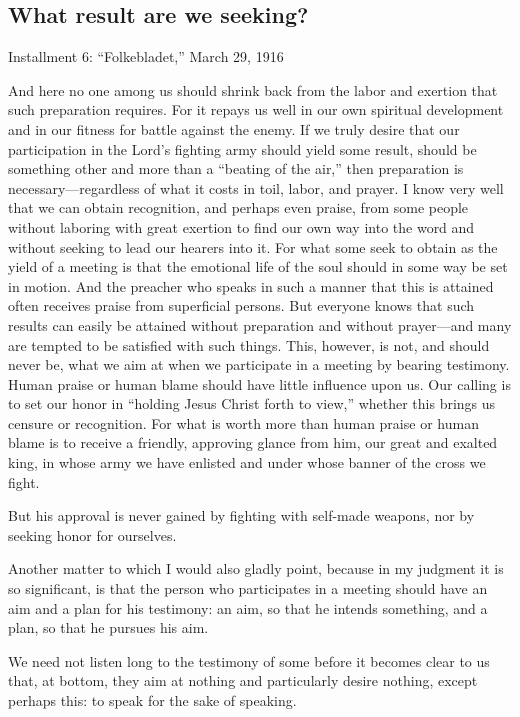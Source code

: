 \subsection{What result are we seeking?}

Installment 6: “Folkebladet,” March 29, 1916

And here no one among us should shrink back from the labor and exertion that such preparation requires. For it repays us well in our own spiritual development and in our fitness for battle against the enemy. If we truly desire that our participation in the Lord’s fighting army should yield some result, should be something other and more than a “beating of the air,” then preparation is necessary—regardless of what it costs in toil, labor, and prayer. I know very well that we can obtain recognition, and perhaps even praise, from some people without laboring with great exertion to find our own way into the word and without seeking to lead our hearers into it. For what some seek to obtain as the yield of a meeting is that the emotional life of the soul should in some way be set in motion. And the preacher who speaks in such a manner that this is attained often receives praise from superficial persons. But everyone knows that such results can easily be attained without preparation and without prayer—and many are tempted to be satisfied with such things. This, however, is not, and should never be, what we aim at when we participate in a meeting by bearing testimony. Human praise or human blame should have little influence upon us. Our calling is to set our honor in “holding Jesus Christ forth to view,” whether this brings us censure or recognition. For what is worth more than human praise or human blame is to receive a friendly, approving glance from him, our great and exalted king, in whose army we have enlisted and under whose banner of the cross we fight.

But his approval is never gained by fighting with self-made weapons, nor by seeking honor for ourselves.

Another matter to which I would also gladly point, because in my judgment it is so significant, is that the person who participates in a meeting should have an aim and a plan for his testimony: an aim, so that he intends something, and a plan, so that he pursues his aim.

We need not listen long to the testimony of some before it becomes clear to us that, at bottom, they aim at nothing and particularly desire nothing, except perhaps this: to speak for the sake of speaking.

